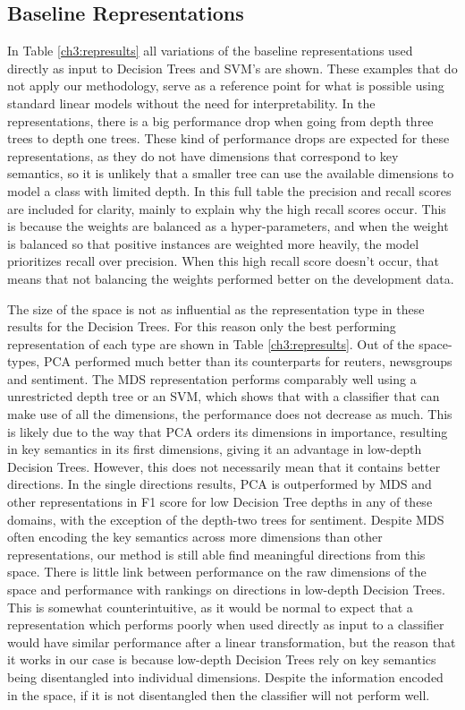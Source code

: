 \subsection{Baseline Representations}

In Table \ref{ch3:represults} all variations of the baseline representations used directly as input to Decision Trees and SVM's are shown. These examples that do not apply our methodology, serve as a reference point for what is possible using standard linear models without the need for interpretability. In the representations, there is a big performance drop when going from depth three trees to depth one trees. These kind of performance drops are expected for these representations, as they do not have dimensions that correspond to key semantics, so it is unlikely that a smaller tree can use the available dimensions to model a class with limited depth. In this full table the precision and recall scores are included for clarity, mainly to explain why the high recall scores occur. This is because the weights are balanced as a hyper-parameters, and when the weight is balanced so that positive instances are weighted more heavily, the model prioritizes recall over precision. When this high recall score doesn't occur, that means that not balancing the weights performed better on the development data.

The size of the space is not as influential as the representation type in these results for the Decision Trees. For this reason only the best performing representation of each type are shown in Table \ref{ch3:represults}. Out of the space-types, PCA performed much better than its counterparts for reuters, newsgroups and sentiment.  The MDS representation performs comparably well using a unrestricted depth tree or an SVM, which shows that with a classifier that can make use of all the dimensions, the performance does not decrease as much. This is likely due to the way that PCA orders its dimensions in importance,  resulting in key semantics in its first dimensions, giving it an advantage in low-depth Decision Trees. However, this does not necessarily mean that it contains better directions. In the single directions results, PCA is outperformed by MDS and other representations in F1 score for low Decision Tree depths in any of these domains, with the exception of the depth-two trees for sentiment. Despite MDS often encoding the key semantics across more dimensions than other representations, our method is still able find meaningful directions from this space. There is little link between performance on the raw dimensions of the space and performance with rankings on directions in low-depth Decision Trees.  This is somewhat counterintuitive, as it would be normal to expect that a representation which performs poorly when used directly as input to a classifier would have similar performance after a linear transformation, but the reason that it works in our case is because low-depth Decision Trees rely on key semantics being disentangled into individual dimensions. Despite the information encoded in the space, if it is not disentangled then the classifier will not perform well.



